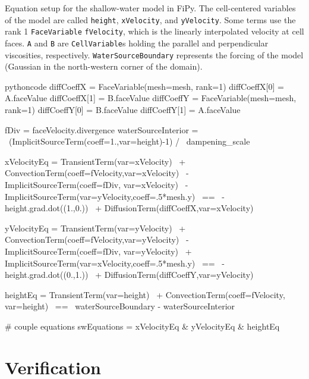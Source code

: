 \begin{listing}[p]
	\caption[Equation setup for the shallow-water model in FiPy.]{Equation setup for the shallow-water model in FiPy. The cell-centered variables of the model are called \texttt{height}, \texttt{xVelocity}, and \texttt{yVelocity}. Some terms use the rank 1 \texttt{FaceVariable} \texttt{fVelocity}, which is the linearly interpolated velocity at cell faces. \texttt{A} and \texttt{B} are \texttt{CellVariable}s holding the parallel and perpendicular viscosities, respectively. \texttt{WaterSourceBoundary} represents the forcing of the model (Gaussian in the north-western corner of the domain).}
	\label{lst:fipy-equations}
		\begin{listingsbox}{pythoncode}
			diffCoeffX = FaceVariable(mesh=mesh, rank=1)
			diffCoeffX[0] = A.faceValue
			diffCoeffX[1] = B.faceValue
			diffCoeffY = FaceVariable(mesh=mesh, rank=1)
			diffCoeffY[0] = B.faceValue
			diffCoeffY[1] = A.faceValue
			
			fDiv = faceVelocity.divergence
			waterSourceInterior = \
			  (ImplicitSourceTerm(coeff=1.,var=height)-1) / \
			  dampening_scale	 

			xVelocityEq = TransientTerm(var=xVelocity) \
			+ ConvectionTerm(coeff=fVelocity,var=xVelocity) \
			- ImplicitSourceTerm(coeff=fDiv, var=xVelocity) \
			- ImplicitSourceTerm(var=yVelocity,coeff=.5*mesh.y) \
			== \
			- height.grad.dot((1.,0.)) \
			+ DiffusionTerm(diffCoeffX,var=xVelocity)
			
			yVelocityEq = TransientTerm(var=yVelocity) \
			+ ConvectionTerm(coeff=fVelocity,var=yVelocity) \
			- ImplicitSourceTerm(coeff=fDiv, var=yVelocity) \
			+ ImplicitSourceTerm(var=xVelocity,coeff=.5*mesh.y) \
			== \
			- height.grad.dot((0.,1.)) \
			+ DiffusionTerm(diffCoeffY,var=yVelocity)
			
			heightEq = TransientTerm(var=height) \
			+ ConvectionTerm(coeff=fVelocity, var=height) \
			== \
			waterSourceBoundary - waterSourceInterior
			
			# couple equations
			swEquations = xVelocityEq & yVelocityEq & heightEq 
		\end{listingsbox}
\end{listing}

\section{Verification}
\label{sec:appendix-sw-verification}
